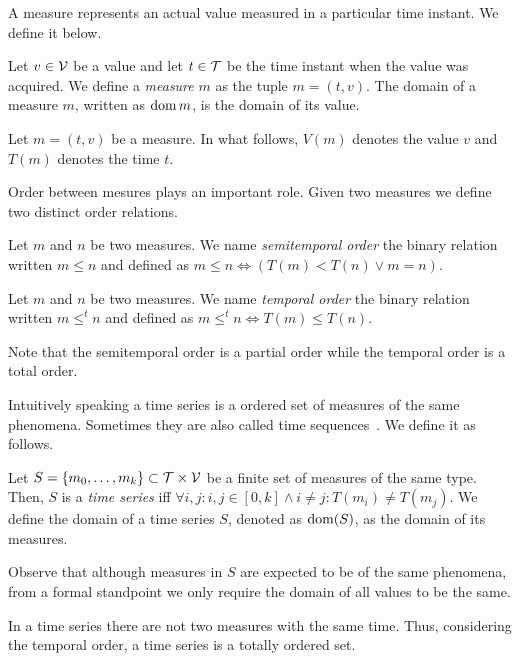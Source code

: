 A measure represents an actual value measured in a particular time
instant. We define it below.

\begin{definition}
  Let $v\in\cal{V}$ be a value and let $t\in\cal{T}$ be the time
  instant when the value was acquired. We define a \emph{measure} $m$
  as the tuple $m=(t,v)$. The domain of a measure $m$, written as
  $\operatorname{dom} m$, is the domain of its value.
\end{definition}

Let $m = (t,v)$ be a measure. In what follows, $V(m)$ denotes the
value $v$ and $T(m)$ denotes the time $t$.

Order between mesures plays an important role. Given two measures we
define two distinct order relations.

\begin{definition}
  Let $m$ and $n$ be two measures. We name \emph{semitemporal order}
  the binary relation written $m\leq n$ and defined as $m\leq n\iff
  (T(m)<T(n) \vee m=n)$.
\end{definition}

\begin{definition} Let $m$ and $n$ be two measures. We
    name \emph{temporal order} the binary relation written $m \leq^t
    n$ and defined as $m \leq^t n \iff T(m) \leq T(n)$.
\end{definition}

Note that the semitemporal order is a partial order while the temporal
order is a total order.

Intuitively speaking a time series is a ordered set of measures of the
same phenomena.  Sometimes they are also called time
sequences~\cite{last:hetland}. We define it as follows.

\begin{definition}
  \label{def:model:timeseries}
  Let $S = \{m_0,\ldots,m_k\}\subset\cal{T}\times\cal{V}$ be a finite
  set of measures of the same type. Then, $S$ is a \emph{time series}
  iff $\forall i,j: i,j\in[0,k] \wedge i\neq j: T(m_i)\neq T(m_j)$.
  We define the domain of a time series $S$, denoted as $\operatorname{dom}(S)$, as
  the domain of its measures.
\end{definition}

Observe that although measures in $S$ are expected to be of the same
phenomena, from a formal standpoint we only require the domain of all
values to be the same. 

In a time series there are not two measures with the same time. Thus,
considering the temporal order, a time series is a totally ordered
set.

